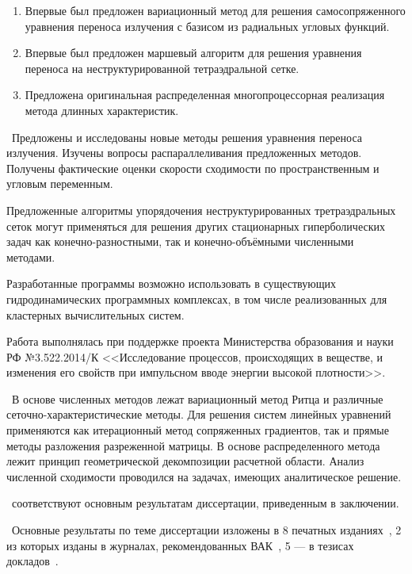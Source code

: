 \novelty
\begin{enumerate}
  \item Впервые был предложен вариационный метод для решения самосопряженного уравнения переноса излучения с базисом из радиальных угловых функций.
  \item Впервые был предложен маршевый алгоритм для решения уравнения переноса на неструктурированной тетраэдральной сетке.
  \item Предложена оригинальная распределенная многопроцессорная реализация метода длинных характеристик.
\end{enumerate}

\influence\ Предложены и исследованы новые методы решения уравнения переноса излучения. Изучены вопросы распараллеливания предложенных методов. Получены фактические оценки скорости сходимости по пространственным и угловым переменным.

Предложенные алгоритмы упорядочения неструктурированных третраэдральных сеток могут применяться для решения других стационарных гиперболических задач как конечно-разностными, так и конечно-объёмными численными методами.

Разработанные программы возможно использовать в существующих гидродинамических программных комплексах, в том числе реализованных для кластерных вычислительных систем.

Работа выполнялась при поддержке проекта Министерства образования и науки РФ №3.522.2014/К <<Исследование процессов, происходящих в веществе, и изменения его свойств при импульсном вводе энергии высокой плотности>>.

\methodology\ В основе численных методов лежат вариационный метод Ритца и различные сеточно-характеристические методы. Для решения систем линейных уравнений применяются как итерационный метод сопряженных градиентов, так и прямые методы разложения разреженной матрицы. 
В основе распределенного метода лежит принцип геометрической декомпозиции расчетной области.
Анализ численной сходимости проводился на задачах, имеющих аналитическое решение.

\ соответствуют основным результатам диссертации, приведенным в заключении.

\probation\ Основные результаты по теме диссертации изложены в 8 печатных изданиях~\cite{skalko2014, tsybulin2015a, tsybulin2015b, miptconf53,miptconf54,miptconf55,miptconf56,miptconf57},
2 из которых изданы в журналах, рекомендованных ВАК~\cite{skalko2014,tsybulin2015a}, 
5 --- в тезисах докладов~\cite{miptconf53,miptconf54,miptconf55,miptconf56,miptconf57}.

